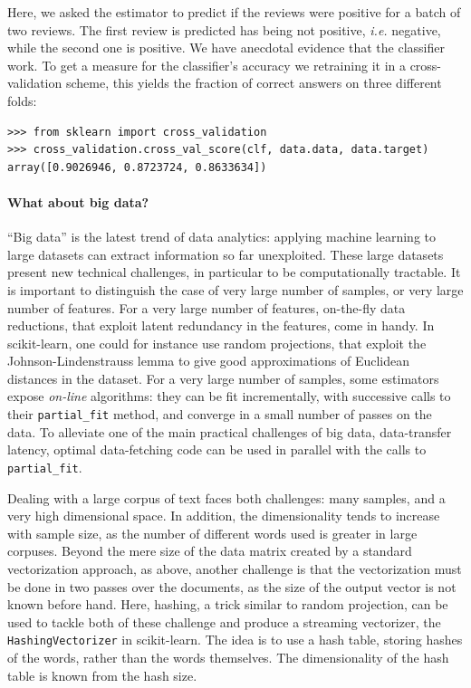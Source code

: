 \documentclass[a4paper]{article}
\begin{document}
Here, we asked the estimator to predict if the reviews were positive for
a batch of two reviews. The first review is predicted has being not
positive, \emph{i.e.} negative, while the second one is positive. We have
anecdotal evidence that the classifier work. To get a measure for the
classifier's accuracy we retraining it in a cross-validation scheme, this
yields the fraction of correct answers on three different folds:
\begin{lstlisting}
>>> from sklearn import cross_validation
>>> cross_validation.cross_val_score(clf, data.data, data.target)
array([0.9026946, 0.8723724, 0.8633634])
\end{lstlisting}

\paragraph{What about big data?}
%
``Big data'' is the latest trend of data analytics: applying machine
learning to large datasets can extract information so far unexploited.
These large datasets present new technical challenges, in
particular to be computationally tractable. It is important to
distinguish the case of very large number of samples, or very large
number of features. For a very large number of features, on-the-fly data
reductions, that exploit latent redundancy in the features, come in
handy. In scikit-learn, one could for instance use
random projections, that exploit the Johnson-Lindenstrauss lemma to give
good approximations of Euclidean distances in the dataset. For
a very large number of samples, some estimators expose
\emph{on-line} algorithms: they can be fit incrementally, with successive
calls to their {\tt partial\_fit} method, and converge in a small number
of passes on the data. To alleviate one of the main practical challenges of
big data, data-transfer latency, optimal data-fetching code can be used
in parallel with the calls to {\tt partial\_fit}.

Dealing with a large corpus of text faces both challenges: many samples,
and a very high dimensional space. In addition, the dimensionality
tends to increase with sample size, as the number of different words used 
is greater in large corpuses. Beyond the mere size of the data matrix
created by a standard vectorization approach, as above, another challenge
is that the vectorization must be done in two passes over the documents,
as the size of the output vector is not known before hand. Here, hashing,
a trick similar to random projection, can be used to tackle both of these
challenge and produce a streaming vectorizer, the {\tt HashingVectorizer}
in scikit-learn. The idea is to use a hash table, storing hashes of the
words, rather than the words themselves. The dimensionality of the hash
table is known from the hash size.
\end{document}
